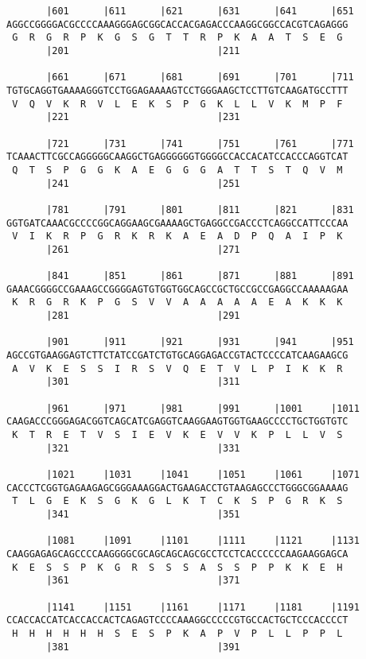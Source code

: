 \documentclass{article}
\begin{document}
\begin{Verbatim}
       |601      |611      |621      |631      |641      |651
AGGCCGGGGACGCCCCAAAGGGAGCGGCACCACGAGACCCAAGGCGGCCACGTCAGAGGG
 G  R  G  R  P  K  G  S  G  T  T  R  P  K  A  A  T  S  E  G 
       |201                          |211                   
  
       |661      |671      |681      |691      |701      |711
TGTGCAGGTGAAAAGGGTCCTGGAGAAAAGTCCTGGGAAGCTCCTTGTCAAGATGCCTTT
 V  Q  V  K  R  V  L  E  K  S  P  G  K  L  L  V  K  M  P  F 
       |221                          |231                   
  
       |721      |731      |741      |751      |761      |771
TCAAACTTCGCCAGGGGGCAAGGCTGAGGGGGGTGGGGCCACCACATCCACCCAGGTCAT
 Q  T  S  P  G  G  K  A  E  G  G  G  A  T  T  S  T  Q  V  M 
       |241                          |251                   
  
       |781      |791      |801      |811      |821      |831
GGTGATCAAACGCCCCGGCAGGAAGCGAAAAGCTGAGGCCGACCCTCAGGCCATTCCCAA
 V  I  K  R  P  G  R  K  R  K  A  E  A  D  P  Q  A  I  P  K 
       |261                          |271                   
  
       |841      |851      |861      |871      |881      |891
GAAACGGGGCCGAAAGCCGGGGAGTGTGGTGGCAGCCGCTGCCGCCGAGGCCAAAAAGAA
 K  R  G  R  K  P  G  S  V  V  A  A  A  A  A  E  A  K  K  K 
       |281                          |291                   
  
       |901      |911      |921      |931      |941      |951
AGCCGTGAAGGAGTCTTCTATCCGATCTGTGCAGGAGACCGTACTCCCCATCAAGAAGCG
 A  V  K  E  S  S  I  R  S  V  Q  E  T  V  L  P  I  K  K  R 
       |301                          |311                   
  
       |961      |971      |981      |991      |1001     |1011
CAAGACCCGGGAGACGGTCAGCATCGAGGTCAAGGAAGTGGTGAAGCCCCTGCTGGTGTC
 K  T  R  E  T  V  S  I  E  V  K  E  V  V  K  P  L  L  V  S 
       |321                          |331                   
  
       |1021     |1031     |1041     |1051     |1061     |1071
CACCCTCGGTGAGAAGAGCGGGAAAGGACTGAAGACCTGTAAGAGCCCTGGGCGGAAAAG
 T  L  G  E  K  S  G  K  G  L  K  T  C  K  S  P  G  R  K  S 
       |341                          |351                   
  
       |1081     |1091     |1101     |1111     |1121     |1131
CAAGGAGAGCAGCCCCAAGGGGCGCAGCAGCAGCGCCTCCTCACCCCCCAAGAAGGAGCA
 K  E  S  S  P  K  G  R  S  S  S  A  S  S  P  P  K  K  E  H 
       |361                          |371                   
  
       |1141     |1151     |1161     |1171     |1181     |1191
CCACCACCATCACCACCACTCAGAGTCCCCAAAGGCCCCCGTGCCACTGCTCCCACCCCT
 H  H  H  H  H  H  S  E  S  P  K  A  P  V  P  L  L  P  P  L 
       |381                          |391                   
  

\end{Verbatim}
\end{document}
